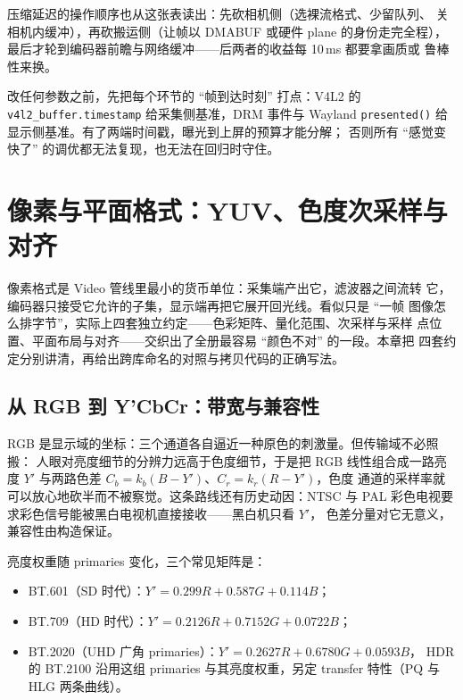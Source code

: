 \documentclass[12pt,a4paper,fontset=fandol]{ctexbook}
\newcommand{\Fn}[1]{\texttt{#1()}}
\newcommand{\Tp}[1]{\texttt{#1}}
\newcommand{\Bk}{\discretionary{}{}{}}
\newcommand{\Lang}[1]{\textsf{#1}}
\newcommand{\DomVid}{\Lang{Video}}
\begin{document}
压缩延迟的操作顺序也从这张表读出：先砍相机侧（选裸流格式、少留队列、
关相机内缓冲），再砍搬运侧（让帧以 DMABUF 或硬件 plane 的身份走完全程），
最后才轮到编码器前瞻与网络缓冲——后两者的收益每 10\,ms 都要拿画质或
鲁棒性来换。

\begin{bestpractice}[title={先量再调：用事件时间戳给采集链路记账}]
改任何参数之前，先把每个环节的 ``帧到达时刻'' 打点：V4L2 的
\Tp{v4l2\_{\Bk}buffer.{\Bk}timestamp} 给采集侧基准，DRM 事件与 Wayland
\Fn{presented} 给显示侧基准。有了两端时间戳，曝光到上屏的预算才能分解；
否则所有 ``感觉变快了'' 的调优都无法复现，也无法在回归时守住。
\end{bestpractice}

\chapter{像素与平面格式：YUV、色度次采样与对齐}
\label{ch:ch05-pixel-format}

像素格式是 \DomVid{} 管线里最小的货币单位：采集端产出它，滤波器之间流转
它，编码器只接受它允许的子集，显示端再把它展开回光线。看似只是 ``一帧
图像怎么排字节''，实际上四套独立约定——色彩矩阵、量化范围、次采样与采样
点位置、平面布局与对齐——交织出了全册最容易 ``颜色不对'' 的一段。本章把
四套约定分别讲清，再给出跨库命名的对照与拷贝代码的正确写法。

\section{从 RGB 到 Y\hspace{0.1em}'CbCr：带宽与兼容性}

RGB 是显示域的坐标：三个通道各自逼近一种原色的刺激量。但传输域不必照搬：
人眼对亮度细节的分辨力远高于色度细节，于是把 RGB 线性组合成一路亮度
\(Y'\) 与两路色差 \(C_b = k_b (B - Y')\)、\(C_r = k_r (R - Y')\)，色度
通道的采样率就可以放心地砍半而不被察觉。这条路线还有历史动因：NTSC 与
PAL 彩色电视要求彩色信号能被黑白电视机直接接收——黑白机只看 \(Y'\)，
色差分量对它无意义，兼容性由构造保证。

亮度权重随 primaries 变化，三个常见矩阵是：

\begin{itemize}
\item BT.601（SD 时代）：\(Y' = 0.299R + 0.587G + 0.114B\)；
\item BT.709（HD 时代）：\(Y' = 0.2126R + 0.7152G + 0.0722B\)；
\item BT.2020（UHD 广角 primaries）：\(Y' = 0.2627R + 0.6780G + 0.0593B\)，
      HDR 的 BT.2100 沿用这组 primaries 与其亮度权重，另定 transfer
      特性（PQ 与 HLG 两条曲线）。
\end{itemize}
\end{document}

